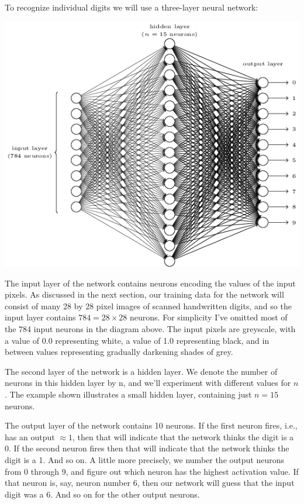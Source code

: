 \documentclass[a4paper,twoside,10pt]{book}
\begin{document}
To recognize individual digits we will use a three-layer neural network:
\begin{center}
	\includegraphics[width=\linewidth]{./figures/ch1/tikz12}
\end{center}
The input layer of the network contains neurons encoding the values of the input pixels. As discussed in the next section, our training data for the network will consist of many 28 by 28 pixel images of scanned handwritten digits, and so the input layer contains $784=28\times28$ neurons. For simplicity I've omitted most of the 784 input neurons in the diagram above. The input pixels are greyscale, with a value of 0.0 representing white, a value of 1.0 representing black, and in between values representing gradually darkening shades of grey.

The second layer of the network is a hidden layer. We denote the number of neurons in this hidden layer by n, and we'll experiment with different values for $n$. The example shown illustrates a small hidden layer, containing just $n=15$ neurons.

The output layer of the network contains 10 neurons. If the first neuron fires, i.e., has an output $\approx 1$, then that will indicate that the network thinks the digit is a 0. If the second neuron fires then that will indicate that the network thinks the digit is a 1. And so on. A little more precisely, we number the output neurons from 0 through 9, and figure out which neuron has the highest activation value. If that neuron is, say, neuron number 6, then our network will guess that the input digit was a 6. And so on for the other output neurons.
\end{document}
